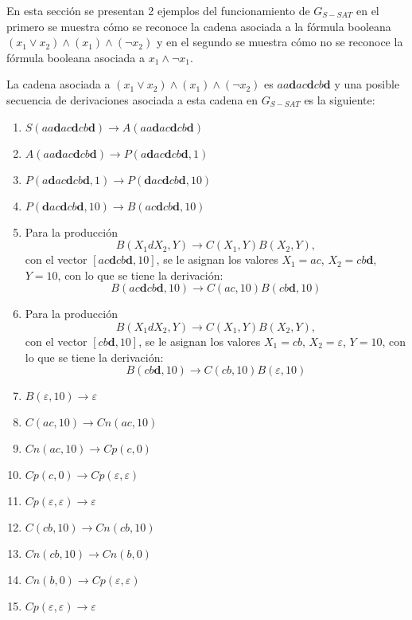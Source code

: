 En esta sección se presentan 2 ejemplos del funcionamiento de $G_{S-SAT}$ en el primero se muestra cómo se reconoce la cadena asociada a la fórmula booleana $(x_1 \vee x_2) \wedge (x_1) \wedge (\neg x_2)$ y en el segundo se muestra cómo no se reconoce la fórmula booleana asociada a $x_1 \wedge \neg x_1$.

La cadena asociada a $(x_1 \vee x_2) \wedge (x_1) \wedge (\neg x_2)$ es $aa\mathbf{d}ac\mathbf{d}cb\mathbf{d}$ y una posible secuencia de derivaciones
asociada a esta cadena en $G_{S-SAT}$ es la siguiente:

\begin{enumerate}
    \item $S(aa\mathbf{d}ac\mathbf{d}cb\mathbf{d})\to A(aa\mathbf{d}ac\mathbf{d}cb\mathbf{d})$
    \item $A(aa\mathbf{d}ac\mathbf{d}cb\mathbf{d})\to P(a\mathbf{d}ac\mathbf{d}cb\mathbf{d},1)$
    \item $P(a\mathbf{d}ac\mathbf{d}cb\mathbf{d},1)\to P(\mathbf{d}ac\mathbf{d}cb\mathbf{d},10)$
    \item $P(\mathbf{d}ac\mathbf{d}cb\mathbf{d},10)\to B(ac\mathbf{d}cb\mathbf{d}, 10)$
    \item Para la producción $$B(X_1dX_2,Y)\to C(X_1,Y) B(X_2,Y),$$ con el vector $[ac\mathbf{d}cb\mathbf{d}, 10]$,
          se le asignan los valores $X_1=ac$, $X_2=cb\mathbf{d}$, $Y=10$, con lo que se tiene la derivación:
          $$B(ac\mathbf{d}cb\mathbf{d}, 10)\to C(ac,10) B(cb\mathbf{d},10)$$
    \item Para la producción $$B(X_1dX_2,Y)\to C(X_1,Y) B(X_2,Y),$$ con el vector $[cb\mathbf{d},10]$,
          se le asignan los valores $X_1=cb$, $X_2=\varepsilon$, $Y=10$, con lo que se tiene la derivación:
          $$B(cb\mathbf{d},10)\to C(cb,10) B(\varepsilon,10)$$
    \item $B(\varepsilon,10)\to \varepsilon$
    \item $C(ac,10)\to Cn(ac,10)$
    \item $Cn(ac,10)\to Cp(c,0)$
    \item $Cp(c,0)\to Cp(\varepsilon,\varepsilon)$
    \item $Cp(\varepsilon, \varepsilon) \to \varepsilon$
    \item $C(cb,10)\to Cn(cb,10)$
    \item $Cn(cb,10)\to Cn(b,0)$
    \item $Cn(b,0)\to Cp(\varepsilon,\varepsilon)$
    \item $Cp(\varepsilon, \varepsilon) \to \varepsilon$
\end{enumerate}

